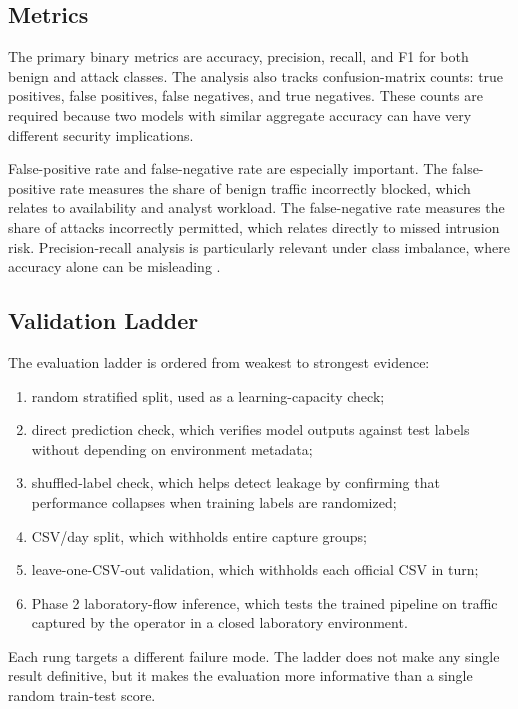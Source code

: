 \subsection{Metrics}
The primary binary metrics are accuracy, precision, recall, and F1 for both benign and attack classes. The analysis also tracks confusion-matrix counts: true positives, false positives, false negatives, and true negatives. These counts are required because two models with similar aggregate accuracy can have very different security implications.

False-positive rate and false-negative rate are especially important. The false-positive rate measures the share of benign traffic incorrectly blocked, which relates to availability and analyst workload. The false-negative rate measures the share of attacks incorrectly permitted, which relates directly to missed intrusion risk. Precision-recall analysis is particularly relevant under class imbalance, where accuracy alone can be misleading \parencite{Fawcett2006ROC,Saito2015PRROC}.

\subsection{Validation Ladder}
The evaluation ladder is ordered from weakest to strongest evidence:
\begin{enumerate}
    \item random stratified split, used as a learning-capacity check;
    \item direct prediction check, which verifies model outputs against test labels without depending on environment metadata;
    \item shuffled-label check, which helps detect leakage by confirming that performance collapses when training labels are randomized;
    \item CSV/day split, which withholds entire capture groups;
    \item leave-one-CSV-out validation, which withholds each official CSV in turn;
    \item Phase 2 laboratory-flow inference, which tests the trained pipeline on traffic captured by the operator in a closed laboratory environment.
\end{enumerate}

Each rung targets a different failure mode. The ladder does not make any single result definitive, but it makes the evaluation more informative than a single random train-test score.

